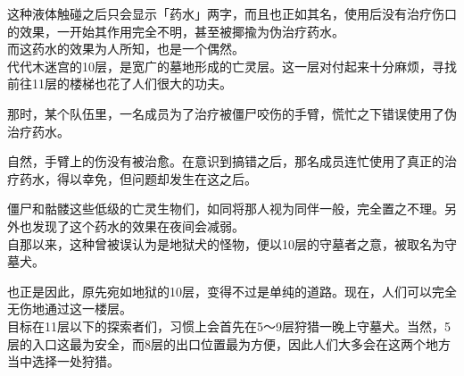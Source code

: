 这种液体触碰之后只会显示「药水」两字，而且也正如其名，使用后没有治疗伤口的效果，一开始其作用完全不明，甚至被揶揄为伪治疗药水。\\

而这药水的效果为人所知，也是一个偶然。\\

代代木迷宫的10层，是宽广的墓地形成的亡灵层。这一层对付起来十分麻烦，寻找前往11层的楼梯也花了人们很大的功夫。

那时，某个队伍里，一名成员为了治疗被僵尸咬伤的手臂，慌忙之下错误使用了伪治疗药水。

自然，手臂上的伤没有被治愈。在意识到搞错之后，那名成员连忙使用了真正的治疗药水，得以幸免，但问题却发生在这之后。

僵尸和骷髅这些低级的亡灵生物们，如同将那人视为同伴一般，完全置之不理。另外也发现了这个药水的效果在夜间会减弱。\\

自那以来，这种曾被误认为是地狱犬的怪物，便以10层的守墓者之意，被取名为守墓犬。

也正是因此，原先宛如地狱的10层，变得不过是单纯的道路。现在，人们可以完全无伤地通过这一楼层。\\

目标在11层以下的探索者们，习惯上会首先在5～9层狩猎一晚上守墓犬。当然，5层的入口这最为安全，而8层的出口位置最为方便，因此人们大多会在这两个地方当中选择一处狩猎。\\

